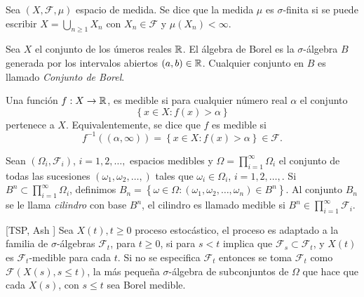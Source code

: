 \begin{Def}
Sea $\left(X,\mathcal{F},\mu\right)$ espacio de medida. Se dice
que la medida $\mu$ es $\sigma$-finita si se puede escribir
$X=\bigcup_{n\geq1}X_{n}$ con $X_{n}\in\mathcal{F}$ y
$\mu\left(X_{n}\right)<\infty$.
\end{Def}

\begin{Def}\label{Cto.Borel}
Sea $X$ el conjunto de los \'umeros reales $\mathbb{R}$. El \'algebra de
Borel es la $\sigma$-\'algebra $B$ generada por los intervalos
abiertos $\left(a,b\right)\in\mathbb{R}$. Cualquier conjunto en $B$ es
llamado {\em Conjunto de Borel}.
\end{Def}

\begin{Def}\label{Funcion.Medible}
Una funci\'on $f:X\rightarrow\mathbb{R}$, es medible si para cualquier
n\'umero real $\alpha$ el conjunto
\[\left\{x\in X:f\left(x\right)>\alpha\right\}\]
pertenece a $X$. Equivalentemente, se dice que $f$ es medible si
\[f^{-1}\left(\left(\alpha,\infty\right)\right)=\left\{x\in X:f\left(x\right)>\alpha\right\}\in\mathcal{F}.\]
\end{Def}


\begin{Def}\label{Def.Cilindros}
Sean $\left(\Omega_{i},\mathcal{F}_{i}\right)$, $i=1,2,\ldots,$
espacios medibles y $\Omega=\prod_{i=1}^{\infty}\Omega_{i}$ el
conjunto de todas las sucesiones
$\left(\omega_{1},\omega_{2},\ldots,\right)$ tales que
$\omega_{i}\in\Omega_{i}$, $i=1,2,\ldots,$. Si
$B^{n}\subset\prod_{i=1}^{\infty}\Omega_{i}$, definimos
$B_{n}=\left\{\omega\in\Omega:\left(\omega_{1},\omega_{2},\ldots,\omega_{n}\right)\in
B^{n}\right\}$. Al conjunto $B_{n}$ se le llama {\em cilindro} con
base $B^{n}$, el cilindro es llamado medible si
$B^{n}\in\prod_{i=1}^{\infty}\mathcal{F}_{i}$.
\end{Def}


\begin{Def}\label{Def.Proc.Adaptado}[TSP, Ash \cite{RBA}]
Sea $X\left(t\right),t\geq0$ proceso estoc\'astico, el proceso es
adaptado a la familia de $\sigma$-\'algebras $\mathcal{F}_{t}$,
para $t\geq0$, si para $s<t$ implica que
$\mathcal{F}_{s}\subset\mathcal{F}_{t}$, y $X\left(t\right)$ es
$\mathcal{F}_{t}$-medible para cada $t$. Si no se especifica
$\mathcal{F}_{t}$ entonces se toma $\mathcal{F}_{t}$ como
$\mathcal{F}\left(X\left(s\right),s\leq t\right)$, la m\'as
peque\~na $\sigma$-\'algebra de subconjuntos de $\Omega$ que hace
que cada $X\left(s\right)$, con $s\leq t$ sea Borel medible.
\end{Def}


